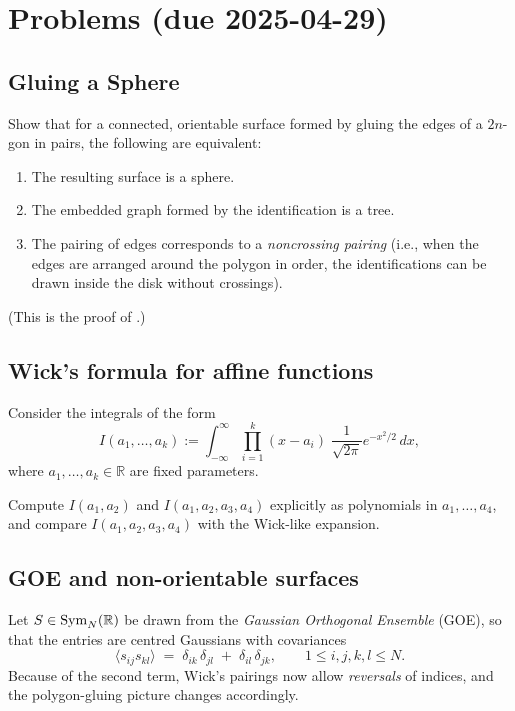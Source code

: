 \documentclass[letterpaper,11pt,oneside,reqno]{article}
\numberwithin{equation}{section}
\theoremstyle{definition}
\begin{document}
\appendix
\setcounter{section}{14}

\section{Problems (due 2025-04-29)}

\subsection{Gluing a Sphere}
\label{prob:gluing_sphere}
Show that for a connected, orientable surface formed by gluing the edges of a $2n$-gon in pairs, the following are equivalent:
\begin{enumerate}
	\item The resulting surface is a sphere.
	\item The embedded graph formed by the identification is a tree.
	\item The pairing of edges corresponds to a \emph{noncrossing pairing} (i.e., when the edges are arranged around the polygon in order, the identifications can be drawn inside the disk without crossings).
\end{enumerate}
(This is the proof of .)

\subsection{Wick's formula for affine functions}
\label{prob:wick-linear}
Consider the integrals of the form
\[
	I(a_1, \ldots, a_k) := \int_{-\infty}^\infty \prod_{i=1}^k (x - a_i)\; \frac{1}{\sqrt{2\pi}} e^{-x^2/2}\, dx,
\]
where $a_1, \ldots, a_k \in \mathbb{R}$ are fixed parameters.

Compute $I(a_1, a_2)$ and $I(a_1, a_2, a_3, a_4)$ explicitly as polynomials in $a_1,\ldots, a_4$,
and compare $I(a_1, a_2, a_3, a_4)$ with the Wick-like expansion.

\subsection{GOE and non-orientable surfaces}
\label{prob:goe-nonorient}

Let $S\in\operatorname{Sym}_N(\Bbb R)$ be drawn from the \emph{Gaussian Orthogonal Ensemble} (GOE), so that the entries
are centred Gaussians with covariances
\[
  \langle s_{ij}s_{kl}\rangle
  \;=\;
  \delta_{ik}\,\delta_{jl}\;+\;\delta_{il}\,\delta_{jk},
  \qquad 1\le i,j,k,l\le N.
\]
Because of the second term, Wick’s pairings now allow \emph{reversals} of
indices, and the polygon-gluing picture changes accordingly.
\end{document}

